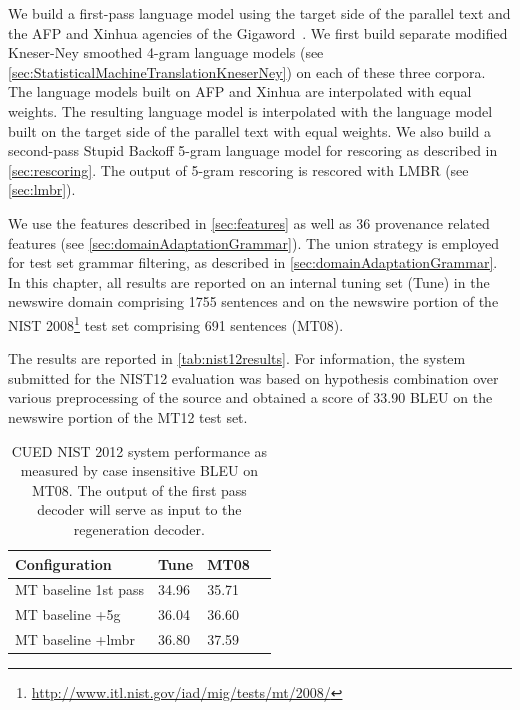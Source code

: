 We build a first-pass language model using the target side
of the parallel text and the AFP and Xinhua agencies of the
Gigaword~\citep{parker-graff-kong-chen-maeda:2009:LDC}. %
We first build separate modified Kneser-Ney smoothed 4-gram language
models (see \autoref{sec:StatisticalMachineTranslationKneserNey})
on each of these three corpora. The language models built on AFP
and Xinhua are interpolated with equal weights. The
resulting language model is interpolated with the
language model built on the target side of the parallel
text with equal weights. We also build a second-pass %
Stupid Backoff 5-gram language model for rescoring
as described in \autoref{sec:rescoring}.
The output of 5-gram rescoring is rescored with LMBR (see \autoref{sec:lmbr}).

We use the features described in \autoref{sec:features}
as well as 36 provenance related features (see \autoref{sec:domainAdaptationGrammar}).
The union
strategy is employed for test set grammar filtering, as described
in \autoref{sec:domainAdaptationGrammar}.
In this chapter, all results are reported on an internal tuning set (Tune)
in the newswire domain comprising
1755 sentences and on the newswire portion of the NIST
2008\footnote{\url{http://www.itl.nist.gov/iad/mig/tests/mt/2008/}} test
set comprising 691 sentences (MT08).

The results are reported in \autoref{tab:nist12results}.
For information, the system submitted for the NIST12 evaluation was based
on hypothesis combination over various preprocessing of the source and obtained
a score of 33.90 BLEU on the newswire portion of the MT12 test set.
%
\begin{table}
  \begin{center}
    \begin{tabular}{l|lll}
      Configuration   & Tune & MT08 \\
      \hline
      MT baseline 1st pass & 34.96 & 35.71 \\
      MT baseline +5g      & 36.04 & 36.60 \\
      MT baseline +lmbr    & 36.80 & 37.59 \\
    \end{tabular}
    \caption{CUED NIST 2012 system performance as measured by case insensitive BLEU on MT08. The output of the
      first pass decoder will serve as input to the regeneration decoder.}
    \label{tab:nist12results}
  \end{center}
\end{table}

